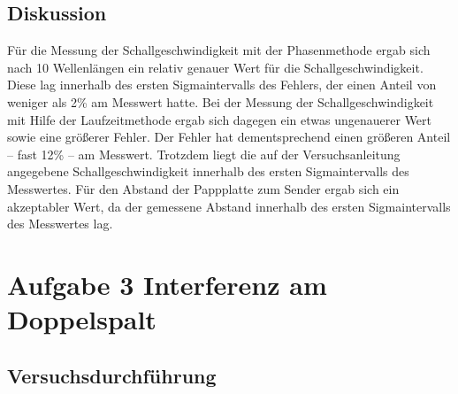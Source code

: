 \documentclass[12pt]{scrartcl}
\begin{document}
\subsection{Diskussion}
Für die Messung der Schallgeschwindigkeit mit der Phasenmethode ergab sich nach 10 Wellenlängen ein relativ genauer Wert für die Schallgeschwindigkeit. Diese lag innerhalb des ersten Sigmaintervalls des Fehlers, der einen Anteil von weniger als 2\% am Messwert hatte.
Bei der Messung der Schallgeschwindigkeit mit Hilfe der Laufzeitmethode ergab sich dagegen ein etwas ungenauerer Wert sowie eine größerer Fehler. Der Fehler hat dementsprechend einen größeren Anteil -- fast 12\% -- am Messwert. Trotzdem liegt die auf der Versuchsanleitung angegebene Schallgeschwindigkeit innerhalb des ersten Sigmaintervalls des Messwertes.
Für den Abstand der Pappplatte zum Sender ergab sich ein akzeptabler Wert, da der gemessene Abstand innerhalb des ersten Sigmaintervalls des Messwertes lag.
\section{Aufgabe 3 Interferenz am Doppelspalt}
\subsection{Versuchsdurchführung}
\end{document}
